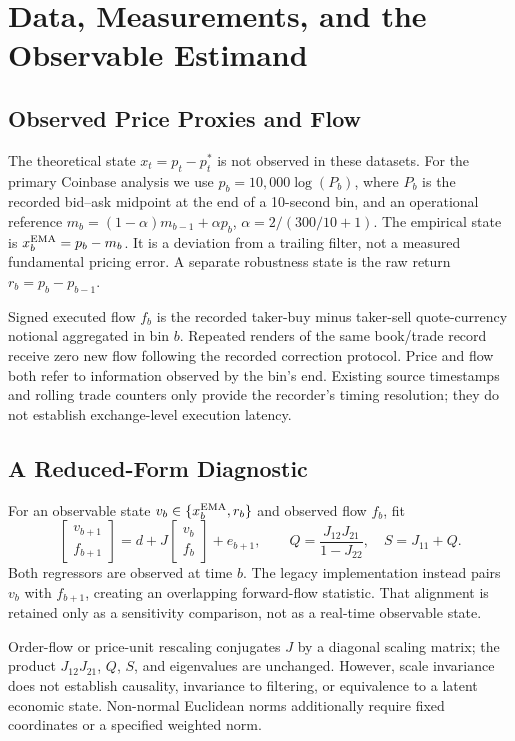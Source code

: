 \documentclass[12pt]{article}
\theoremstyle{definition}
\theoremstyle{remark}
\begin{document}
\section{Data, Measurements, and the Observable Estimand}
\label{sec:data_estimand}
\subsection{Observed Price Proxies and Flow}
The theoretical state $x_t=p_t-p_t^*$ is not observed in these datasets. For the primary Coinbase analysis we use $p_b=10{,}000\log(P_b)$, where $P_b$ is the recorded bid--ask midpoint at the end of a 10-second bin, and an operational reference $m_b=(1-\alpha)m_{b-1}+\alpha p_b$, $\alpha=2/(300/10+1)$. The empirical state is $x_b^{\rm EMA}=p_b-m_b$. It is a deviation from a trailing filter, not a measured fundamental pricing error. A separate robustness state is the raw return $r_b=p_b-p_{b-1}$.

Signed executed flow $f_b$ is the recorded taker-buy minus taker-sell quote-currency notional aggregated in bin $b$. Repeated renders of the same book/trade record receive zero new flow following the recorded correction protocol. Price and flow both refer to information observed by the bin's end. Existing source timestamps and rolling trade counters only provide the recorder's timing resolution; they do not establish exchange-level execution latency.

\subsection{A Reduced-Form Diagnostic}
For an observable state $v_b\in\{x_b^{\rm EMA},r_b\}$ and observed flow $f_b$, fit
\begin{equation}
\begin{bmatrix}v_{b+1}\\f_{b+1}\end{bmatrix}
=d+J\begin{bmatrix}v_b\\f_b\end{bmatrix}+e_{b+1},
\qquad Q=\frac{J_{12}J_{21}}{1-J_{22}},\quad S=J_{11}+Q.
\label{eq:empirical_var_revised}
\end{equation}
Both regressors are observed at time $b$. The legacy implementation instead pairs $v_b$ with $f_{b+1}$, creating an overlapping forward-flow statistic. That alignment is retained only as a sensitivity comparison, not as a real-time observable state.

Order-flow or price-unit rescaling conjugates $J$ by a diagonal scaling matrix; the product $J_{12}J_{21}$, $Q$, $S$, and eigenvalues are unchanged. However, scale invariance does not establish causality, invariance to filtering, or equivalence to a latent economic state. Non-normal Euclidean norms additionally require fixed coordinates or a specified weighted norm.
\end{document}
